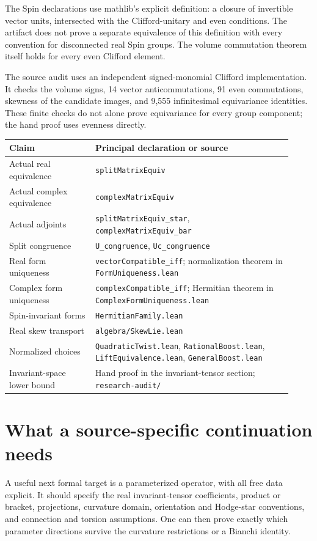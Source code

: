 \documentclass[11pt]{article}
\begin{document}
The Spin declarations use mathlib's explicit definition: a closure of invertible vector units, intersected with the Clifford-unitary and even conditions. The artifact does not prove a separate equivalence of this definition with every convention for disconnected real Spin groups. The volume commutation theorem itself holds for every even Clifford element.

The source audit uses an independent signed-monomial Clifford implementation. It checks the volume signs, 14 vector anticommutations, 91 even commutations, skewness of the candidate images, and 9,555 infinitesimal equivariance identities. These finite checks do not alone prove equivariance for every group component; the hand proof uses evenness directly.

\begingroup\small\raggedright
\begin{longtable}{>{\raggedright\arraybackslash}p{0.28\linewidth}>{\raggedright\arraybackslash}p{0.64\linewidth}}
\toprule
Claim & Principal declaration or source \\\midrule
Actual real equivalence & \texttt{splitMatrixEquiv} \\
Actual complex equivalence & \texttt{complexMatrixEquiv} \\
Actual adjoints & \texttt{splitMatrixEquiv\_star}, \texttt{complexMatrixEquiv\_bar} \\
Split congruence & \texttt{U\_congruence}, \texttt{Uc\_congruence} \\
Real form uniqueness & \texttt{vectorCompatible\_iff}; normalization theorem in \texttt{FormUniqueness.lean} \\
Complex form uniqueness & \texttt{complexCompatible\_iff}; Hermitian theorem in \texttt{ComplexFormUniqueness.lean} \\
Spin-invariant forms & \texttt{HermitianFamily.lean} \\
Real skew transport & \texttt{algebra/SkewLie.lean} \\
Normalized choices & \texttt{QuadraticTwist.lean}, \texttt{RationalBoost.lean}, \texttt{LiftEquivalence.lean}, \texttt{GeneralBoost.lean} \\
Invariant-space lower bound & Hand proof in the invariant-tensor section; \texttt{research-audit/} \\\bottomrule
\end{longtable}
\endgroup

\section{What a source-specific continuation needs}
A useful next formal target is a parameterized operator, with all free data explicit. It should specify the real invariant-tensor coefficients, product or bracket, projections, curvature domain, orientation and Hodge-star conventions, and connection and torsion assumptions. One can then prove exactly which parameter directions survive the curvature restrictions or a Bianchi identity.
\end{document}
